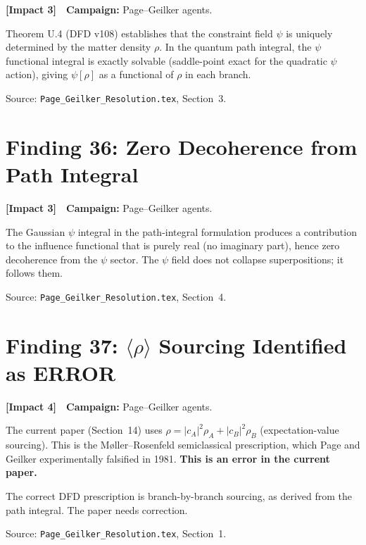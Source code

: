 \documentclass[11pt,a4paper]{article}
\newcommand{\impactfour}{\textcolor{impact4}{\textbf{[Impact 4]}}}
\newcommand{\impactthree}{\textcolor{impact3}{\textbf{[Impact 3]}}}
\begin{document}
\impactthree\ \ \textbf{Campaign:} Page--Geilker agents.

Theorem U.4 (DFD v108) establishes that the constraint field $\psi$
is uniquely determined by the matter density $\rho$. In the quantum
path integral, the $\psi$ functional integral is exactly solvable
(saddle-point exact for the quadratic $\psi$ action), giving
$\psi[\rho]$ as a functional of $\rho$ in each branch.

Source: \texttt{Page\_Geilker\_Resolution.tex}, Section~3.


\section{Finding 36: Zero Decoherence from Path Integral}
\label{sec:decoherence}

\impactthree\ \ \textbf{Campaign:} Page--Geilker agents.

The Gaussian $\psi$ integral in the path-integral formulation produces
a contribution to the influence functional that is purely real (no
imaginary part), hence zero decoherence from the $\psi$ sector. The
$\psi$ field does not collapse superpositions; it follows them.

Source: \texttt{Page\_Geilker\_Resolution.tex}, Section~4.


\section{Finding 37: $\langle\rho\rangle$ Sourcing Identified as ERROR}
\label{sec:rho-error}

\impactfour\ \ \textbf{Campaign:} Page--Geilker agents.

The current paper (Section~14) uses $\rho = |c_A|^2\rho_A + |c_B|^2\rho_B$
(expectation-value sourcing). This is the M{\o}ller--Rosenfeld
semiclassical prescription, which Page and Geilker experimentally
falsified in 1981. \textbf{This is an error in the current paper.}

The correct DFD prescription is branch-by-branch sourcing, as derived
from the path integral. The paper needs correction.

Source: \texttt{Page\_Geilker\_Resolution.tex}, Section~1.
\end{document}
